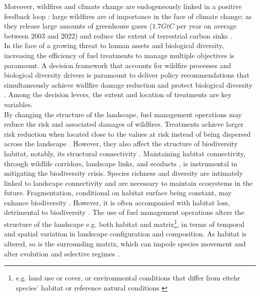 %
Moreover, wildfires and climate change are endogeneously linked in a positive feedback loop : large wildfires are of importance in the face of climate change; as they release large amounts of greenhouse gases ($1.7GtC$ per year on average between 2003 and 2022) and reduce the extent of terrestrial carbon sinks \citep{zheng_record-high_2023, friedlingstein_2023, byrne_carbon_2024}. \\
\hspace*{1.5em}In the face of a growing threat to human assets and biological diversity, increasing the efficiency of fuel treatments to manage multiple objectives is paramount. A decision framework that accounts for wildfire processes and biological diversity drivers is paramount to deliver policy recommendations that simultaneously achieve widlfire damage reduction and protect biological diversity \citep{driscoll_resolving_2010}. Among the decision levers, the extent and location of treatments are key variables. 
%
\\
By changing the structure of the landscape, fuel management operations may reduce the risk and associated damages of wildfires. Treatments achieve larger risk reduction when located close to the values at risk instead of being dispersed across the landscape \citep{ager_modeling_2007, Williams2017,Florec2020}. However, they also affect the structure of biodiversity habitat, notably, its structural connectivity \citep{Taylor93}. Maintaining habitat connectivity, through wildlife corridors, landscape links, and ecoducts \citep{Turner2005, Turner2011}, is instrumental in mitigating the biodiversity crisis. Species richness and diversity are intimately linked to landscape connectivity \citep{Olds2012, tian_assessing_2017, velazquez_structural_2019} and are necessary to maintain ecosystems in the future. Fragmentation, conditional on habitat surface being constant, may enhance biodiversity \citep{tischendorf_usage_2000, hu_effects_2012, may_geometry_2019}. However, it is often accompanied with habitat loss, detrimental to biodiversity \citep{fahrig_effects_2003}. The use of fuel management operations alters the structure of the landscape e.g. both habitat and matrix\footnote{e.g. land use or cover, or environmental conditions that differ from eitehr species' habitat or reference natural conditions \citep{fletcher_prominent_2024}}, in terms of temporal and spatial variation in landscape configuration and composition. As habitat is altered, so is the surrounding matrix, which can impede species movement \citep{eycott_meta-analysis_2012, kuefler_conflicting_2010} and alter evolution and selective regimes \citep{cheptou_adaptation_2017}.\\
